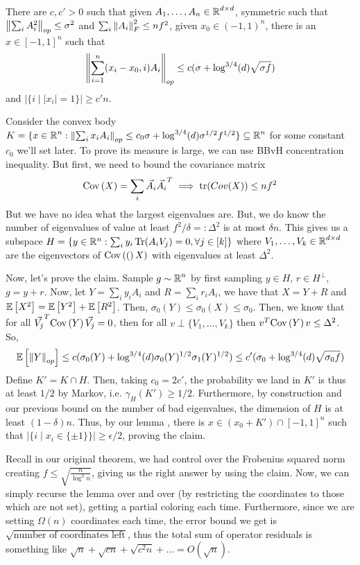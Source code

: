 \begin{lemma}
    There are $c, c' > 0$ such that given $A_1, \dots, A_n \in \operatorname{\mathbb{R}}^{d \times d}$,
    symmetric such that $\norm{\sum_i A_i^2}_{op} \le \sigma^2$ and $\sum_i \norm{A_i}_F^2 \le nf^2$, given
    $x_0 \in (-1 , 1)^n$, there is an $x \in [-1, 1]^n$ such that
    \[ \norm{\sum_{i= 1}^{n} (x_i - x_0,i) A_i}_{op} \le c(\sigma + \log^{3/4}(d) \sqrt{\sigma f}) \]
    and $|\{i \mid |x_i| = 1\}| \ge c'n$.
\end{lemma}

Consider the convex body
$K = \{x \in \operatorname{\mathbb{R}}^n : \norm{\sum_i x_i A_i}_{op} \le c_0 \sigma + \log^{3/4}(d) \sigma^{1/2} f^{1/2}\} \subseteq \operatorname{\mathbb{R}}^n$
for some constant $c_0$ we'll set later.
To prove its measure is large, we can use BBvH concentration inequality.
But first, we need to bound the covariance matrix
\[ \text{Cov}\left( X \right) = \sum_i \vec{A_i} \vec{A_i}^T \implies \tr(Cov(X)) \le nf^2\]
But we have no idea what the largest eigenvalues are. But, we do know the number of eigenvalues
of value at least $f^2/\delta =: \Delta^2$ is at most $\delta n$. This gives us a subspace
$H = \{y \in \mathbb{R}^n : \sum_i y_i \Tr(A_i V_j) = 0, \forall j \in [k] \}$
where $V_1, \dots, V_k \in \operatorname{\mathbb{R}}^{d\times d}$ are the eigenvectors of $\text{Cov}\left( ( \right)X)$ with eigenvalues at least $\Delta^2$.

Now, let's prove the claim. Sample $g \sim \operatorname{\mathbb{R}}^n$ by first sampling $y \in H$,
$r \in H^{\perp}$, $g = y + r$.
Now, let $Y = \sum_i y_i A_i$ and $R = \sum_i r_i A_i$,
we have that $X = Y + R$ and $\mathbb{E}\left[ X^2 \right] = \mathbb{E}\left[ Y^2 \right] + \mathbb{E}\left[ R^2 \right]$. Then,
$\sigma_0(Y) \le \sigma_0(X) \le \sigma_0$. Then, we know that
for all $\vec{V_j}^{T} \text{Cov}\left( Y \right) \vec{V_j} = 0$, then for all $v \perp \{V_1, \dots, V_k\}$
then $v^T \text{Cov}\left( Y \right) v \le \Delta^2$. So,
\[ \mathbb{E}\left[ \norm{Y}_{op} \right] \le c(\sigma_0(Y) +\log^{3/4}(d) \sigma_0(Y)^{1/2} \sigma_1(Y)^{1/2}) \le c'(\sigma_0 + \log^{3/4}(d) \sqrt{\sigma_0 f}) \]
Define $K' = K \cap H$. Then, taking $c_0 = 2c'$, the probability we land in $K'$ is thus at least $1/2$ by Markov,
i.e. $\gamma_H(K') \ge 1/2$. Furthermore, by construction and our previous bound on the
number of bad eigenvalues, the dimension of $H$ is at least $(1 - \delta)n$.
Thus, by our lemma , there is $x \in (x_0 + K') \cap [-1, 1]^n$ such that $|\{i \mid x_i \in \{\pm 1\}\}| \ge \epsilon/2$,
proving the claim.

Recall in our original theorem, we had control over the Frobenius squared norm creating $f \le \sqrt{\frac{n}{\log^3 n}}$,
giving us the right answer by using the claim. Now, we can simply recurse the lemma over and over (by
restricting the coordinates to those which are not set), getting a partial coloring each time.
Furthermore, since we are setting $\Omega(n)$ coordinates each time, the error bound we get is $\sqrt{\text{number of coordinates left}}$,
thus the total sum of operator residuals is something like $\sqrt{n} + \sqrt{cn} + \sqrt{c^2 n} + \dots = O(\sqrt{n})$.

